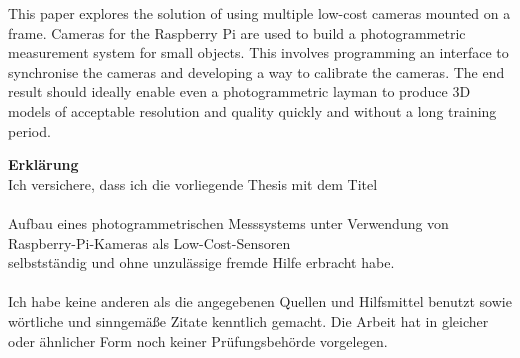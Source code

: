 \documentclass[a4paper,12pt,bibliography=totoc, listof=totoc, titlepage]{scrreprt}
\begin{document}
This paper explores the solution of using multiple low-cost cameras mounted on a frame. Cameras for the Raspberry Pi are used to build a photogrammetric measurement system for small objects. This involves programming an interface to synchronise the cameras and developing a way to calibrate the cameras. The end result should ideally enable even a photogrammetric layman to produce 3D models of acceptable resolution and quality quickly and without a long training period.

\newpage

\tableofcontents
\newpage

\setcounter{page}{1}

















\clearpage

\printglossaries

\clearpage
\renewcommand\UrlFont\itshape
\renewcommand{\refname}{Literaturverzeichnis}

\listoffigures
\listoftables


\renewcommand{\appendixpagename}{\appendixname}
\renewcommand{\appendixtocname}{\appendixname}
\begin{appendices}
    
    
\end{appendices}

\clearpage
\thispagestyle{empty}
\noindent\textbf{\large Erklärung}\\
Ich versichere, dass ich die vorliegende Thesis mit dem Titel\\
\\
Aufbau eines photogrammetrischen Messsystems unter Verwendung von Raspberry-Pi-Kameras als Low-Cost-Sensoren
\\
selbstständig und ohne unzulässige fremde Hilfe erbracht habe.\\
\\
Ich habe keine anderen als die angegebenen Quellen und Hilfsmittel benutzt sowie wörtliche und
sinngemäße Zitate kenntlich gemacht. Die Arbeit hat in gleicher oder ähnlicher Form
noch keiner Prüfungsbehörde vorgelegen.
\\
\\
\\
\\
\end{document}
